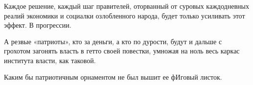Каждое решение, каждый шаг правителей, оторванный от суровых каждодневных
реалий экономики и социалки озлобленного народа, будет только усиливать этот
эффект. В прогрессии.

А резвые «патриоты», кто за деньги, а кто по дурости, будут и дальше с грохотом
загонять власть в гетто своей повестки, умножая на ноль весь каркас института
власти, как таковой. 

Каким бы патриотичным орнаментом не был вышит ее фИговый листок.

